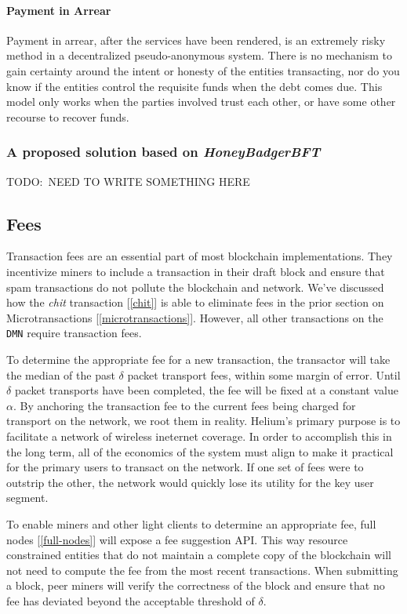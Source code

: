 \documentclass[UTF8, 10pt, nonatbib, nocopyrightspace, reprint]{sigplanconf}
\newcommand{\todo}[1]{}
\renewcommand{\todo}[1]{{\color{red} TODO:\ {#1}}}
\newcommand{\secref}[1]{[\autoref{#1}]}
\begin{document}
\paragraph{Payment in Arrear}
Payment in arrear, after the services have been rendered, is an extremely risky method in a decentralized pseudo-anonymous system. There is no mechanism to gain certainty around the intent or honesty of the entities transacting, nor do you know if the entities control the requisite funds when the debt comes due. This model only works when the parties involved trust each other, or have some other recourse to recover funds.

\subsubsection{A proposed solution based on \emph{HoneyBadgerBFT}}

\todo{NEED TO WRITE SOMETHING HERE}

\subsection{Fees} \label{fees}

Transaction fees are an essential part of most blockchain implementations. They incentivize miners to include a transaction in their draft block and ensure that spam transactions do not pollute the blockchain and network. We've discussed how the \emph{chit} transaction \secref{chit} is able to eliminate fees in the prior section on Microtransactions \secref{microtransactions}. However, all other transactions on the \verb|DMN| require transaction fees.

To determine the appropriate fee for a new transaction, the transactor will take the median of the past $\delta$ packet transport fees, within some margin of error. Until $\delta$ packet transports have been completed, the fee will be fixed at a constant value $\alpha$. By anchoring the transaction fee to the current fees being charged for transport on the network, we root them in reality. Helium's primary purpose is to facilitate a network of wireless ineternet coverage. In order to accomplish this in the long term, all of the economics of the system must align to make it practical for the primary users to transact on the network. If one set of fees were to outstrip the other, the network would quickly lose its utility for the key user segment.

To enable miners and other light clients to determine an appropriate fee, full nodes \secref{full-nodes} will expose a fee suggestion API. This way resource constrained entities that do not maintain a complete copy of the blockchain will not need to compute the fee from the most recent transactions. When submitting a block, peer miners will verify the correctness of the block and ensure that no fee has deviated beyond the acceptable threshold of $\delta$.
\end{document}
